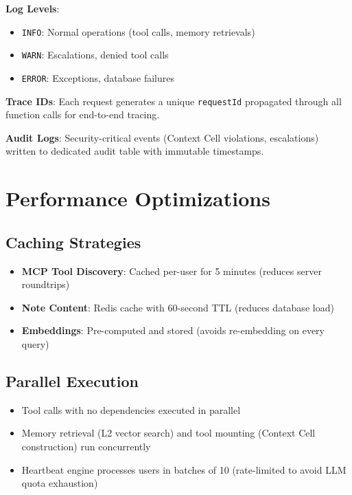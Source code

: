 \textbf{Log Levels}:
\begin{itemize}
    \item \texttt{INFO}: Normal operations (tool calls, memory retrievals)
    \item \texttt{WARN}: Escalations, denied tool calls
    \item \texttt{ERROR}: Exceptions, database failures
\end{itemize}

\textbf{Trace IDs}: Each request generates a unique \texttt{requestId} propagated through all function calls for end-to-end tracing.

\textbf{Audit Logs}: Security-critical events (Context Cell violations, escalations) written to dedicated audit table with immutable timestamps.

\section{Performance Optimizations}

\subsection{Caching Strategies}

\begin{itemize}
    \item \textbf{MCP Tool Discovery}: Cached per-user for 5 minutes (reduces server roundtrips)
    \item \textbf{Note Content}: Redis cache with 60-second TTL (reduces database load)
    \item \textbf{Embeddings}: Pre-computed and stored (avoids re-embedding on every query)
\end{itemize}

\subsection{Parallel Execution}

\begin{itemize}
    \item Tool calls with no dependencies executed in parallel
    \item Memory retrieval (L2 vector search) and tool mounting (Context Cell construction) run concurrently
    \item Heartbeat engine processes users in batches of 10 (rate-limited to avoid LLM quota exhaustion)
\end{itemize}

